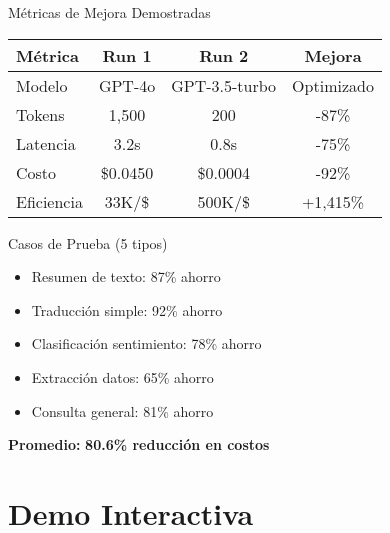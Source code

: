 \documentclass[aspectratio=169,11pt]{beamer}
\begin{document}
\begin{frame}{Métricas de Mejora Demostradas}
\begin{table}[h]
\centering
\begin{tabular}{|l|c|c|c|}
\hline
\textbf{Métrica} & \textbf{Run 1} & \textbf{Run 2} & \textbf{Mejora} \\ \hline
Modelo & GPT-4o & GPT-3.5-turbo & \textcolor{kavakgreen}{Optimizado} \\ \hline
Tokens & 1,500 & 200 & \textcolor{kavakgreen}{-87\%} \\ \hline
Latencia & 3.2s & 0.8s & \textcolor{kavakgreen}{-75\%} \\ \hline
Costo & \$0.0450 & \$0.0004 & \textcolor{kavakgreen}{-92\%} \\ \hline
Eficiencia & 33K/\$ & 500K/\$ & \textcolor{kavakgreen}{+1,415\%} \\ \hline
\end{tabular}
\end{table}

\vspace{0.5cm}

\begin{exampleblock}{Casos de Prueba (5 tipos)}
\begin{itemize}
    \item Resumen de texto: 87\% ahorro
    \item Traducción simple: 92\% ahorro
    \item Clasificación sentimiento: 78\% ahorro
    \item Extracción datos: 65\% ahorro
    \item Consulta general: 81\% ahorro
\end{itemize}
\textbf{Promedio:} \textcolor{kavakgreen}{\textbf{80.6\% reducción en costos}}
\end{exampleblock}
\end{frame}

\section{Demo Interactiva}
\end{document}
